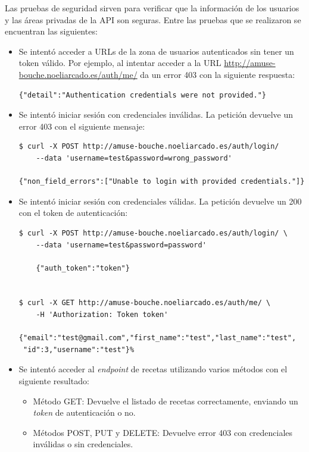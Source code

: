 Las pruebas de seguridad sirven para verificar que la información de los
usuarios y las áreas privadas de la API son seguras. Entre las pruebas que se
realizaron se encuentran las siguientes:
\begin{itemize}
\item Se intentó acceder a URLs de la zona de usuarios autenticados sin tener
  un token válido. Por ejemplo, al intentar acceder a la URL
  \url{http://amuse-bouche.noeliarcado.es/auth/me/} da un error 403 con la
  siguiente respuesta:
  \begin{verbatim}
{"detail":"Authentication credentials were not provided."}
  \end{verbatim}

\item Se intentó iniciar sesión con credenciales inválidas. La petición devuelve
  un error 403 con el siguiente mensaje:
  \begin{verbatim}
$ curl -X POST http://amuse-bouche.noeliarcado.es/auth/login/
    --data 'username=test&password=wrong_password'

{"non_field_errors":["Unable to login with provided credentials."]}
  \end{verbatim}

\item Se intentó iniciar sesión con credenciales válidas. La petición devuelve un
  200 con el token de autenticación:

  \begin{verbatim}
$ curl -X POST http://amuse-bouche.noeliarcado.es/auth/login/ \
    --data 'username=test&password=password'

    {"auth_token":"token"}

    
$ curl -X GET http://amuse-bouche.noeliarcado.es/auth/me/ \
    -H 'Authorization: Token token'
    
{"email":"test@gmail.com","first_name":"test","last_name":"test",
 "id":3,"username":"test"}%  
  \end{verbatim}

\item Se intentó acceder al \textit{endpoint} de recetas utilizando varios
  métodos con el siguiente resultado:

  \begin{itemize}
  \item Método GET: Devuelve el listado de recetas correctamente, enviando un
    \textit{token} de autenticación o no.

  \item Métodos POST, PUT y DELETE: Devuelve error 403 con credenciales inválidas o sin
    credenciales.


\end{itemize}
\end{itemize}
